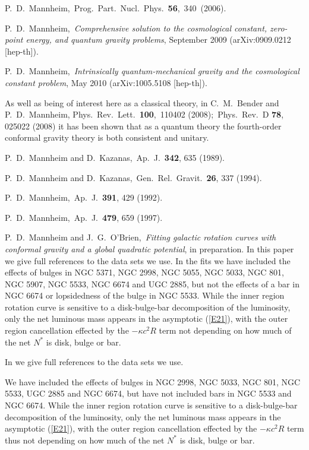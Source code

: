

\begin{thebibliography}{10}

 P.~D.~Mannheim,~Prog.~Part.~Nucl.~Phys.~{\bf 56},~340~(2006). 

 P.~D.~Mannheim,~{\it Comprehensive solution to the cosmological constant, zero-point energy, and quantum gravity problems}, September 2009 (arXiv:0909.0212 [hep-th]). 

 P.~D.~Mannheim,~{\it Intrinsically quantum-mechanical gravity and the cosmological constant problem}, May 2010 (arXiv:1005.5108 [hep-th]). 

 As well as being of interest here as a classical theory, in  C.~M.~Bender and P.~D.~Mannheim, Phys.~Rev.~Lett.~{\bf 100},~110402 (2008);~Phys.~Rev.~D {\bf 78},
025022 (2008) it has been shown that as a quantum theory the  fourth-order conformal gravity theory is  both consistent and unitary.


 P.~D.~Mannheim and D.~Kazanas,~Ap.~J.~{\bf 342}, 635 (1989).

 P.~D.~Mannheim and D.~Kazanas,~Gen.~Rel.~Gravit.~{\bf 26}, 337 (1994).

 P.~D.~Mannheim,~Ap.~J.~{\bf 391}, 429 (1992). 


 P.~D.~Mannheim,~Ap.~J.~{\bf 479}, 659 (1997).


 P.~D.~Mannheim and J.~G.~O'Brien,~{\it Fitting galactic rotation curves with conformal gravity and a global quadratic potential}, in preparation.  In this paper we give full references to the data sets we use. In the fits we have included the effects of bulges in NGC 5371, NGC 2998, NGC 5055, NGC 5033, NGC 801, NGC 5907, NGC 5533, NGC 6674 and UGC 2885, but not the effects of a bar in NGC 6674 or lopsidedness of the bulge in NGC 5533. While the inner region rotation curve is sensitive to a disk-bulge-bar decomposition of the luminosity, only the net luminous mass appears in the asymptotic (\ref{E21}), with the outer region cancellation effected by the $-\kappa c^2R$ term not depending on how much of the net $N^*$ is disk, bulge or bar.


 In \cite{Mannheim2010b} we give full references to the data sets we use. 

 We have included the effects of bulges in NGC 2998, NGC 5033, NGC 801, NGC 5533, UGC 2885 and NGC 6674,  but have not included bars in NGC 5533 and NGC 6674. While the inner region rotation curve is sensitive to a disk-bulge-bar decomposition of the luminosity, only the net luminous mass appears in the asymptotic (\ref{E21}), with the outer region cancellation effected by the $-\kappa c^2R$ term  thus not depending on how much of the net $N^*$ is disk, bulge or bar.



\end{thebibliography}
